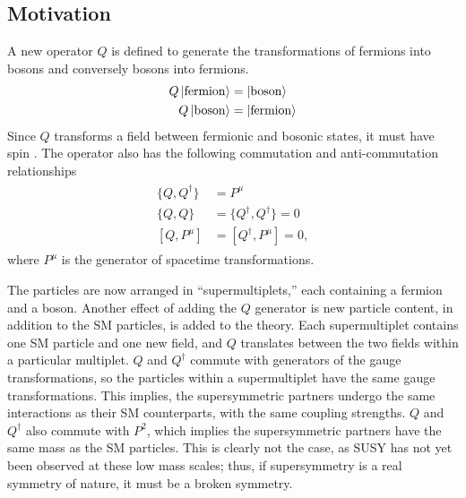 \FloatBarrier
\subsection{Motivation}
\label{sec:susy_motivation}

A new operator $Q$ is defined to generate the transformations of fermions into
bosons and conversely bosons into fermions.
\begin{align}
  \begin{split}
    Q\ket{\mathrm{fermion}} & = \ket{\mathrm{boson}} \\
    Q\ket{\mathrm{boson}}   & = \ket{\mathrm{fermion}}
  \end{split}
\end{align}
Since $Q$ transforms a field between fermionic and bosonic states, it must
have spin .
The operator also has the following commutation and anti-commutation
relationships
\begin{align}
  \begin{split}
    \{Q, Q^{\dagger}\} & = P^{\mu} \\
    \{Q, Q\}           & = \{Q^{\dagger}, Q^{\dagger}\} = 0 \\
    [Q, P^{\mu}]       & = [Q^{\dagger}, P^{\mu}] = 0,
  \end{split}
\end{align}
where $P^{\mu}$ is the generator of spacetime transformations.

The particles are now arranged in ``supermultiplets,'' each containing a
fermion and a boson.
Another effect of adding the $Q$ generator is new particle content, in addition
to the SM particles, is added to the theory.
Each supermultiplet contains one SM particle and one new field, and $Q$
translates between the two fields within a particular multiplet.
$Q$ and $Q^{\dagger}$ commute with generators of the gauge transformations,
so the particles within a supermultiplet have the same gauge transformations.
This implies, the supersymmetric partners undergo the same interactions as
their SM counterparts, with the same coupling strengths.
$Q$ and $Q^{\dagger}$ also commute with $P^2$, which implies the supersymmetric
partners have the same mass as the SM particles.
This is clearly not the case, as SUSY has not yet been observed at these low
mass scales; thus, if supersymmetry is a real symmetry of nature, it must be
a broken symmetry.

